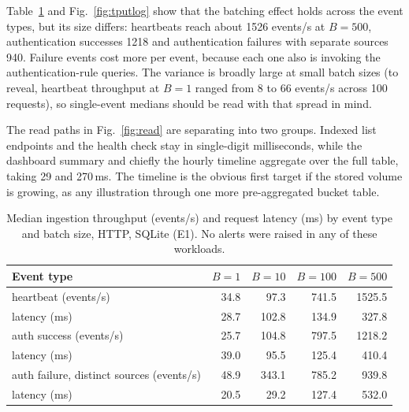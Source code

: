 \documentclass[conference]{IEEEtran}
\begin{document}
Table~\ref{tab:tput} and Fig.~\ref{fig:tputlog} show that the batching effect holds across the event types, but its size differs: heartbeats reach about 1526 events/s at $B=500$, authentication successes 1218 and authentication failures with separate sources 940. Failure events cost more per event, because each one also is invoking the authentication-rule queries. The variance is broadly large at small batch sizes (to reveal, heartbeat throughput at $B=1$ ranged from 8 to 66 events/s across 100 requests), so single-event medians should be read with that spread in mind.

The read paths in Fig.~\ref{fig:read} are separating into two groups. Indexed list endpoints and the health check stay in single-digit milliseconds, while the dashboard summary and chiefly the hourly timeline aggregate over the full table, taking 29 and 270\,ms. The timeline is the obvious first target if the stored volume is growing, as any illustration through one more pre-aggregated bucket table.

\begin{table}[t]
\caption{Median ingestion throughput (events/s) and request latency (ms) by event type and batch size, HTTP, SQLite (E1). No alerts were raised in any of these workloads.}
\label{tab:tput}
\centering
\scriptsize
\setlength{\tabcolsep}{3pt}
\begin{tabular}{@{}l r r r r@{}}
\toprule
Event type & $B{=}1$ & $B{=}10$ & $B{=}100$ & $B{=}500$ \\
\midrule
heartbeat (events/s) & 34.8 & 97.3 & 741.5 & 1525.5 \\
\quad latency (ms) & 28.7 & 102.8 & 134.9 & 327.8 \\
auth success (events/s) & 25.7 & 104.8 & 797.5 & 1218.2 \\
\quad latency (ms) & 39.0 & 95.5 & 125.4 & 410.4 \\
auth failure, distinct sources (events/s) & 48.9 & 343.1 & 785.2 & 939.8 \\
\quad latency (ms) & 20.5 & 29.2 & 127.4 & 532.0 \\
\bottomrule
\end{tabular}
\end{table}
\end{document}
